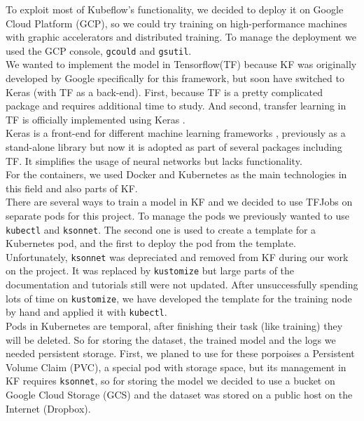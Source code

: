 \documentclass[
	12pt, %
]{fphw}
\begin{document}
To exploit most of Kubeflow's functionality, we decided to deploy it on Google Cloud Platform (GCP), so we could try training on high-performance machines with graphic accelerators and distributed training. To manage the deployment we used the GCP console, \verb|gcould| and \verb|gsutil|.\\

We wanted to implement the model in Tensorflow(TF) because KF was originally developed by Google specifically for this framework, but soon have switched to Keras (with TF as a back-end). First, because TF is a pretty complicated package and requires additional time to study. And second, transfer learning in TF is officially implemented using Keras \cite{tf}.\\

Keras is a front-end for different machine learning frameworks \cite{keras}, previously as a stand-alone library but now it is adopted as part of several packages including TF. It simplifies the usage of neural networks but lacks functionality.\\

For the containers, we used Docker and Kubernetes as the main technologies in this field and also parts of KF. \\

There are several ways to train a model in KF and we decided to use TFJobs on separate pods for this project. To manage the pods we previously wanted to use \verb|kubectl| and \verb|ksonnet|. The second one is used to create a template for a Kubernetes pod, and the first to deploy the pod from the template. Unfortunately, \verb|ksonnet| was depreciated and removed from KF during our work on the project. It was replaced by \verb|kustomize| but large parts of the documentation and tutorials still were not updated. After unsuccessfully spending lots of time on \verb|kustomize|, we have developed the template for the training node by hand and applied it with \verb|kubectl|.\\

Pods in Kubernetes are temporal, after finishing their task (like training) they will be deleted. So for storing the dataset, the trained model and the logs we needed persistent storage. First, we planed to use for these porpoises a Persistent Volume Claim (PVC), a special pod with storage space, but its management in KF requires \verb|ksonnet|, so for storing the model we decided to use a bucket on Google Cloud Storage (GCS) and the dataset was stored on a public host on the Internet (Dropbox).\\
\end{document}
